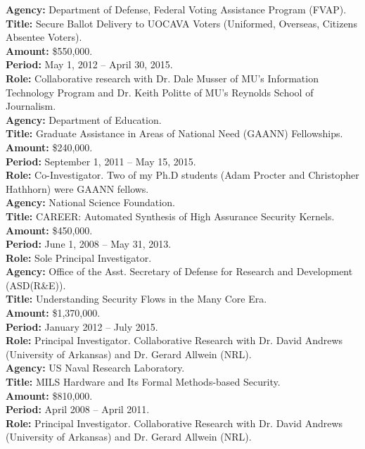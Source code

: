 \documentclass[12pt]{article} %
\begin{document}
{\bf Agency:} Department of Defense, Federal Voting Assistance Program (FVAP).
\\
{\bf Title:} Secure Ballot Delivery to UOCAVA Voters (Uniformed, Overseas, Citizens Absentee Voters). 
\\
{\bf Amount:} \$550,000.
\\
{\bf Period:} May 1, 2012 -- April 30, 2015.
\\
{\bf Role:} Collaborative research with Dr. Dale Musser of MU's Information Technology Program and Dr. Keith Politte of MU's Reynolds School of Journalism. 
\\



{\bf Agency:} Department of Education.
 ~\\
{\bf Title:} Graduate Assistance in Areas of National Need (GAANN) Fellowships.
\\
{\bf Amount:} \$240,000.
\\
{\bf Period:} September 1, 2011 -- May 15, 2015.
\\
{\bf Role:} Co-Investigator. Two of my Ph.D students (Adam Procter and Christopher Hathhorn) were GAANN fellows. 
\\

{\bf Agency:} National Science Foundation.
\\
{\bf Title:} CAREER: Automated Synthesis of High Assurance Security Kernels.
\\
{\bf Amount:} \$450,000.
\\
{\bf Period:}   June 1, 2008  --  May 31, 2013.
\\
{\bf Role:}      Sole Principal Investigator.
\\

{\bf Agency:} Office of the Asst. Secretary of Defense for Research and Development (ASD(R\&E)).
\\
{\bf Title:} Understanding Security Flows in the Many Core Era.
\\
{\bf Amount:} \$1,370,000.
\\
{\bf Period:}   January 2012  --  July 2015.
\\
{\bf Role:}      Principal Investigator. Collaborative Research with Dr. David Andrews (University of Arkansas) and Dr. Gerard Allwein (NRL).
\\

{\bf Agency:} US Naval Research Laboratory.
\\
{\bf Title:} MILS Hardware and Its Formal Methods-based Security.
\\
{\bf Amount:} \$810,000.
\\
{\bf Period:}   April 2008  --  April 2011.
\\
{\bf Role:}      Principal Investigator. Collaborative Research with Dr. David Andrews (University of Arkansas) and Dr. Gerard Allwein (NRL).
\\
\end{document}
